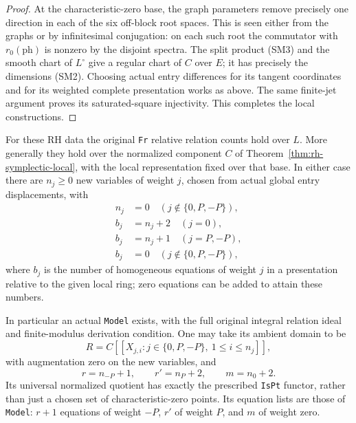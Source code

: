 \begin{proof}
At the characteristic-zero base, the graph parameters
remove precisely one direction in each of the six
off-block root spaces. This is seen either from
the graphs or by infinitesimal conjugation:
on each such root the commutator with
\(r_0(\mathrm{ph})\) is nonzero by the disjoint
spectra. The split product (SM3) and the smooth
chart of \(L^\circ\) give a regular chart of \(C\)
over \(E\); it has precisely the dimensions (SM2).
Choosing actual entry differences for its tangent
coordinates and for its weighted complete presentation
works as above. The same finite-jet argument proves
its saturated-square injectivity. This completes the
local constructions.
\end{proof}

\begin{theorem}
\label{thm:rh-symplectic-model}
For these RH data the original \texttt{Fr} relative relation
counts hold over \(L\). More generally they hold over the
normalized component \(C\) of Theorem~\ref{thm:rh-symplectic-local},
with the local representation fixed over that base.
In either case there are \(n_j\ge0\) new variables of weight \(j\),
chosen from actual global entry displacements, with
\[
 \begin{split}
 n_j&=0\quad(j\notin\{0,P,-P\}),\\
 b_j&=n_j+2\quad(j=0),\\
 b_j&=n_j+1\quad(j=P,-P),\\
 b_j&=0\quad(j\notin\{0,P,-P\}),
 \end{split}                                                   \tag{SM7}
\]
where \(b_j\) is the number of homogeneous equations of weight \(j\)
in a presentation relative to the given local ring; zero equations
can be added to attain these numbers.

In particular an actual \texttt{Model} exists, with the full
original integral relation ideal and finite-modulus derivation
condition. One may take its ambient domain to be
\[
 R=C[[X_{j,i}: j\in\{0,P,-P\},\ 1\le i\le n_j]],
                                                               \tag{SM8}
\]
with augmentation zero on the new variables, and
\[
 r=n_{-P}+1,\qquad r'=n_P+2,\qquad m=n_0+2.                    \tag{SM9}
\]
Its universal normalized quotient has exactly the prescribed
\texttt{IsPt} functor, rather than just a chosen set of
characteristic-zero points. Its equation lists are those
of \texttt{Model}: \(r+1\) equations of weight \(-P\),
\(r'\) of weight \(P\), and \(m\) of weight zero.
\end{theorem}

